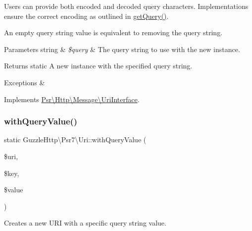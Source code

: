 Users can provide both encoded and decoded query characters. Implementations ensure the correct encoding as outlined in \hyperlink{classGuzzleHttp_1_1Psr7_1_1Uri_a67650b5b4d619cb30e2951da11d0f369}{get\+Query()}.

An empty query string value is equivalent to removing the query string.


\begin{DoxyParams}[1]{Parameters}
string & {\em \$query} & The query string to use with the new instance. \\
\hline
\end{DoxyParams}
\begin{DoxyReturn}{Returns}
static A new instance with the specified query string. 
\end{DoxyReturn}

\begin{DoxyExceptions}{Exceptions}
{\em } & \\
\hline
\end{DoxyExceptions}


Implements \hyperlink{interfacePsr_1_1Http_1_1Message_1_1UriInterface_a66f1ac4196c69ab824c408e2d6e89b10}{Psr\textbackslash{}\+Http\textbackslash{}\+Message\textbackslash{}\+Uri\+Interface}.

\mbox{\label{classGuzzleHttp_1_1Psr7_1_1Uri_a6c78bb020386bd502b492ca7b786d447}} 
\subsubsection{\texorpdfstring{with\+Query\+Value()}{withQueryValue()}}
{\footnotesize\ttfamily static Guzzle\+Http\textbackslash{}\+Psr7\textbackslash{}\+Uri\+::with\+Query\+Value (\begin{DoxyParamCaption}\item[{\hyperlink{interfacePsr_1_1Http_1_1Message_1_1UriInterface}{Uri\+Interface}}]{\$uri,  }\item[{}]{\$key,  }\item[{}]{\$value }\end{DoxyParamCaption})\hspace{0.3cm}{\ttfamily [static]}}

Creates a new U\+RI with a specific query string value.

